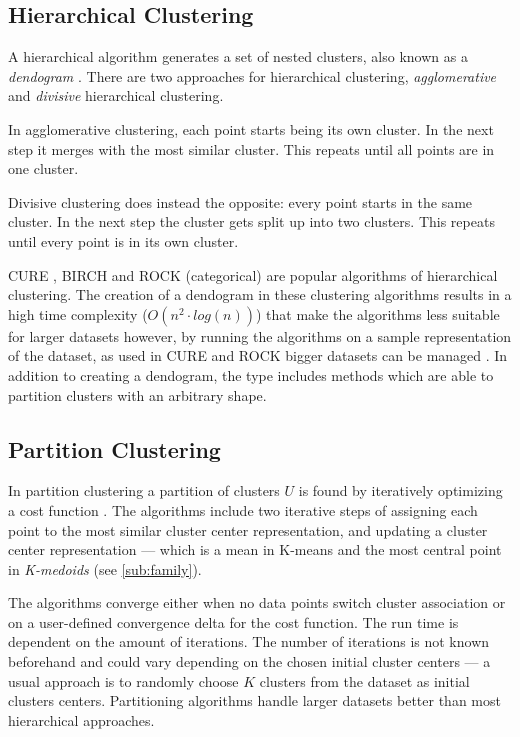 \documentclass[../report.tex]{subfiles}
\begin{document}
\subsection{Hierarchical Clustering}
A hierarchical algorithm generates a set of nested clusters, also known as a \textit{dendogram} \cite{Xu2015, Jain1999}. There are two approaches for hierarchical clustering, \textit{agglomerative} and \textit{divisive} hierarchical clustering.

In agglomerative clustering, each point starts being its own cluster. In the next step it merges with the most similar cluster. This repeats until all points are in one cluster.

Divisive clustering does instead the opposite: every point starts in the same cluster. In the next step the cluster gets split up into two clusters. This repeats until every point is in its own cluster.

CURE \cite{Jain1999}, BIRCH \cite{zhou2012ensemble} and ROCK (categorical) \cite{Guha2000} are popular algorithms of hierarchical clustering. The creation of a dendogram in these clustering algorithms results in a high time complexity ($O(n^2 \cdot log(n))$) that make the algorithms less suitable for larger datasets however, by running the algorithms on a sample representation of the dataset, as used in CURE and ROCK bigger datasets can be managed \cite{Xu2015,Jain1999}. In addition to creating a dendogram, the type includes methods which are able to partition clusters with an arbitrary shape. %


\subsection{Partition Clustering}
\label{sub:part}
In partition clustering a partition of clusters $U$ is found by iteratively optimizing a cost function \cite{huang2005automated, Xu2015,Jain1999}. The algorithms include two iterative steps of assigning each point to the most similar cluster center representation, and updating a cluster center representation --- which is a mean in K-means and the most central point in \textit{K-medoids} (see \cref{sub:family}).

The algorithms converge either when no data points switch cluster association or on a user-defined convergence delta for the cost function. The run time is dependent on the amount of iterations. The number of iterations is not known beforehand and could vary depending on the chosen initial cluster centers --- a usual approach is to randomly choose $K$ clusters from the dataset as initial clusters centers. Partitioning algorithms handle larger datasets better than most hierarchical approaches.
\end{document}
